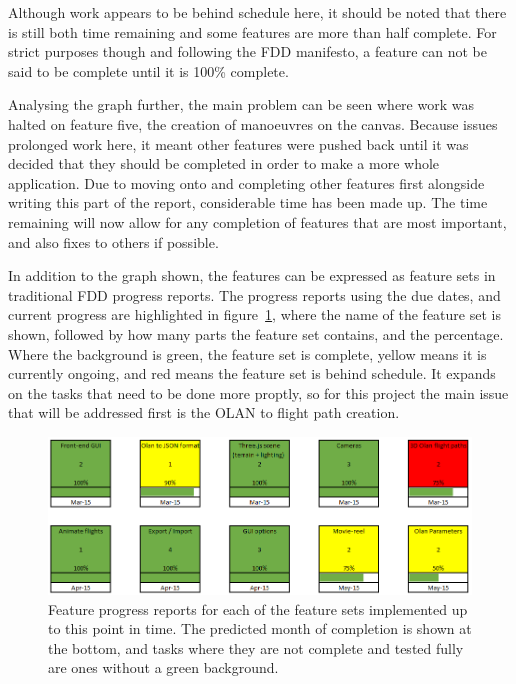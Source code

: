 Although work appears to be behind schedule here, it should be noted that there is still both time remaining and some features are more than half complete. For strict purposes though and following the FDD manifesto, a feature can not be said to be complete until it is 100\% complete. 

Analysing the graph further, the main problem can be seen where work was halted on feature five, the creation of manoeuvres on the canvas. Because issues prolonged work here, it meant other features were pushed back until it was decided that they should be completed in order to make a more whole application. Due to moving onto and completing other features first alongside writing this part of the report, considerable time has been made up. The time remaining will now allow for any completion of features that are most important, and also fixes to others if possible. 

In addition to the graph shown, the features can be expressed as feature sets in traditional FDD progress reports. The progress reports using the due dates, and current progress are highlighted in figure~\ref{fig:featureprogress}, where the name of the feature set is shown, followed by how many parts the feature set contains, and the percentage. Where the background is green, the feature set is complete, yellow means it is currently ongoing, and red means the feature set is behind schedule. It expands on the tasks that need to be done more proptly, so for this project the main issue that will be addressed first is the OLAN to flight path creation.

\begin{figure}[h!]
  \centering
      \includegraphics[width=1\textwidth]{images/featureProgress.png}
  \caption{Feature progress reports for each of the feature sets implemented up to this point in time. The predicted month of completion is shown at the bottom, and tasks where they are not complete and tested fully are ones without a green background.}
  \label{fig:featureprogress}
\end{figure}

